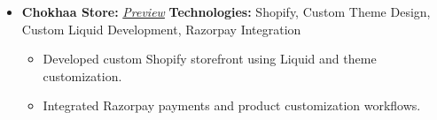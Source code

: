 \documentclass[10pt,a4paper]{article}
\begin{document}
{\begin{itemize}[leftmargin=*, noitemsep]

    \item \textbf{Chokhaa Store:} \hfill \textit{\href{https://chokhaa.com}{\color{blue}Preview}}
    \newline
    {\small \textbf{Technologies:} Shopify, Custom Theme Design, Custom Liquid Development, Razorpay Integration}
    \begin{itemize}[leftmargin=*, noitemsep, topsep=2pt]
        \item Developed custom Shopify storefront using Liquid and theme customization.
        \item Integrated Razorpay payments and product customization workflows.
    \end{itemize}
\end{itemize}

}
\end{document}
